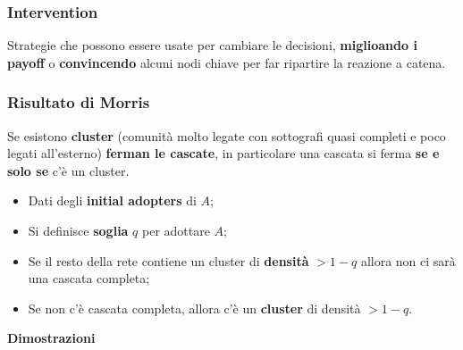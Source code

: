 \documentclass{article}
\begin{document}
    \subsubsection{Intervention}
      Strategie che possono essere usate per cambiare le decisioni, \textbf{miglioando i payoff} o \textbf{convincendo} alcuni nodi chiave per far ripartire la reazione a catena.
    \subsubsection{Risultato di Morris}
      Se esistono \textbf{cluster} (comunità molto legate con sottografi quasi completi e poco legati all'esterno) \textbf{ferman le cascate}, in particolare una cascata si ferma \textbf{se e solo se} c'è un cluster.
      \begin{itemize}
          \item Dati degli \textbf{initial adopters} di $A$;
          \item Si definisce \textbf{soglia} $q$ per adottare $A$;
          \item Se il resto della rete contiene un cluster di \textbf{densità} $> 1-q$ allora non ci sarà una cascata completa;
          \item Se non c'è cascata completa, allora c'è un \textbf{cluster} di densità $> 1-q$.
      \end{itemize}
      \textbf{Dimostrazioni}
\end{document}
